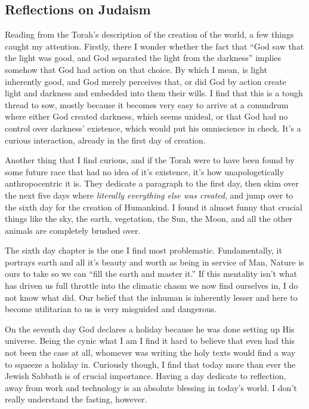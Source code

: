 \documentclass[12pt,letterpaper]{article}
\begin{document}
\begin{spacing}{2}
    \section{Reflections on Judaism}
    Reading from the Torah's description of the creation of the world, a few
    things caught my attention. Firstly, there I wonder whether the fact that
    ``God saw that the light was good, and God separated the light from the
    darkness'' implies somehow that God had action on that choice. By which I
    mean, is light inherently good, and God merely perceives that, or did God by
    action create light and darkness and embedded into them their wills. I find
    that this is a tough thread to sow, mostly because it becomes very easy to
    arrive at a conundrum where either God created darkness, which seems
    unideal, or that God had no control over darkness' existence, which would
    put his omniscience in check. It's a curious interaction, already in the
    first day of creation.

    Another thing that I find curious, and if the Torah were to have been found
    by some future race that had no idea of it's existence, it's how
    unapologetically anthropocentric it is. They dedicate a paragraph to the
    first day, then skim over the next five days where \emph{literally
    everything else was created}, and jump over to the sixth day for the
    creation of Humankind. I found it almost funny that crucial things like the
    sky, the earth, vegetation, the Sun, the Moon, and all the other animals are
    completely brushed over.

    The sixth day chapter is the one I find most problematic. Fundamentally, it
    portrays earth and all it's beauty and worth as being in service of Man,
    Nature is ours to take so we can ``fill the earth and master it.'' If this
    mentality isn't what has driven us full throttle into the climatic chasm we
    now find ourselves in, I do not know what did. Our belief that the inhuman
    is inherently lesser and here to become utilitarian to us is very misguided
    and dangerous.

    On the seventh day God declares a holiday because he was done setting up His
    universe. Being the cynic what I am I find it hard to believe that even had
    this not been the case at all, whomever was writing the holy texts would
    find a way to squeeze a holiday in. Curiously though, I find that today more
    than ever the Jewish Sabbath is of crucial importance. Having a day dedicate
    to reflection, away from work and technology is an absolute blessing in
    today's world. I don't really understand the fasting, however.


\end{spacing}
\end{document}

